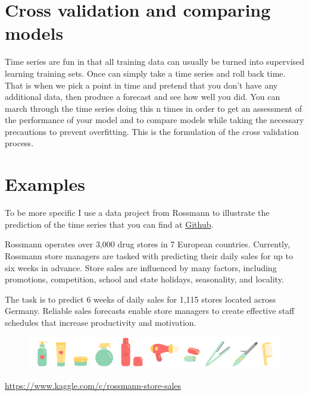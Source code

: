 \documentclass[11pt,fleqn]{book} %
\begin{document}
\section{Cross validation and comparing models}

Time series are fun in that all training data can usually be turned into supervised learning training sets. Once can simply take a time series and roll back time. That is when we pick a point in time and pretend that you don't have any additional data, then produce a forecast and see how well you did. You can march through the time series doing this n times in order to get an assessment of the performance of your model and to compare models while taking the necessary precautions to prevent overfitting. This is the formulation of the cross validation process.

\section{Examples}
To be more specific I use a data project from Rossmann to illustrate the prediction of the time series that you can find at \href{https://github.com/sergeplatonov/Data_problems/tree/master/Time%20series%20forecasting}{Github}.

\begin{remark}
Rossmann operates over 3,000 drug stores in 7 European countries. Currently, Rossmann store managers are tasked with predicting their daily sales for up to six weeks in advance. Store sales are influenced by many factors, including promotions, competition, school and state holidays, seasonality, and locality. 

The task is to predict 6 weeks of daily sales for 1,115 stores located across Germany. Reliable sales forecasts enable store managers to create effective staff schedules that increase productivity and motivation. 
\begin{figure}[h]
\center
\includegraphics[width=0.8\linewidth]{Pictures/rossmann.png}
\end{figure}
\end{remark}
\url{https://www.kaggle.com/c/rossmann-store-sales}
\end{document}
